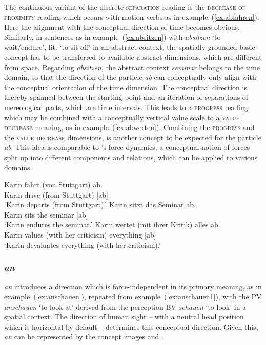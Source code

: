 \documentclass[output=paper]{langsci/langscibook}
\begin{document}
The continuous variant of the discrete \textsc{separation} reading is
the \textsc{decrease of proximity} reading which occurs with motion
verbs as in example~(\ref{ex:abfahren}). Here the alignment with the
conceptual direction of time becomes obvious. Similarly, in sentences
as in example~(\ref{ex:absitzen}) with \textit{absitzen} `to
wait/endure', lit. `to sit off' in an abstract context, the spatially
grounded basic concept has to be transferred to available abstract
dimensions, which are different from space. Regarding
\textit{absitzen}, the abstract context \textit{seminar} belongs to
the time domain, so that the direction of the particle \textit{ab} can
conceptually only align with the conceptual orientation of the time
dimension. The conceptual direction is thereby spanned between the
starting point and an iteration of separations of mereological parts,
which are time intervals. This leads to a \textsc{progress} reading
which may be combined with a conceptually vertical value scale
\citep{Tversky:11} to a \textsc{value decrease} meaning, as in
example~(\ref{ex:abwerten}). Combining the \textsc{progress} and the
\textsc{value decrease} dimensions,  is another
concept to be expected for the particle \textit{ab}. This idea is
comparable to \cite{Talmy:00}'s force dynamics, a conceptual notion of
forces split up into different components and relations, which can be
applied to various domains.

\ea\label{ex:abfahren}
\gll Karin fährt (von Stuttgart) ab.\\
Karin drive (from Stuttgart) [ab]\\
\glt `Karin departs (from Stuttgart).'
\ex \label{ex:absitzen}
\gll Karin sitzt das Seminar ab.\\
Karin sits the seminar [ab]\\
\glt `Karin endures the seminar.'
\ex \label{ex:abwerten}
\gll Karin wertet (mit ihrer Kritik) alles ab.\\
Karin values (with her criticism) everything [ab]\\
\glt `Karin devaluates everything (with her criticism).'
\z


\subsubsection{\textit{an}}

\textit{an} introduces a direction which is force-independent in its
primary meaning, as in example~(\ref{ex:anschauen}), repeated from
example~(\ref{ex:anschauen1}), with the PV \textit{anschauen} `to
look at' derived from the perception BV \textit{schauen} `to look'
in a spatial context. The direction of human sight -- with a neutral
head position which is horizontal by default -- determines this
conceptual direction. Given this, \textit{an} can be represented by
the concept images  and .
\end{document}
